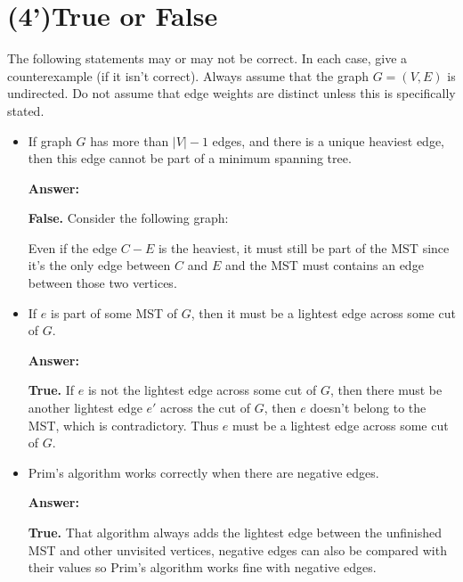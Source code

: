 \documentclass{article}
\begin{document}
\section{(4')True or False}
The following statements may or may not be correct. In each case, give a counterexample (if it isn’t correct). Always assume that the graph $G = (V, E)$ is undirected. Do not assume that edge weights are distinct unless this is specifically stated.
\begin{itemize}
	\item If graph $G$ has more than $|V|-1$ edges, and there is a unique heaviest edge, then this edge cannot be part of a minimum spanning tree.
	\par\textbf{Answer:}
	\par\textbf{False.} Consider the following graph:
	\par{}
    \par Even if the edge $C-E$ is the heaviest, it must still be part of the MST since it's the only edge between $C$ and $E$ and the MST must contains an edge between those two vertices.
	\vspace{0.3in}
	
	\item If $e$ is part of some MST of $G$, then it must be a lightest edge across some cut of $G$.
	\par\textbf{Answer:}
	\par\textbf{True.} If $e$ is not the lightest edge across some cut of $G$, then there must be another lightest edge $e'$ across the cut of $G$, then $e$ doesn't belong to the MST, which is contradictory. Thus $e$ must be a lightest edge across some cut of $G$.
	\vspace{0.3in}

	\item Prim’s algorithm works correctly when there are negative edges.
	\par\textbf{Answer:}
	\par\textbf{True.} That algorithm always adds the lightest edge between the unfinished MST and other unvisited vertices, negative edges can also be compared with their values so Prim's algorithm works fine with negative edges.
    \vspace{0.3in}
\end{itemize}
\newpage
\end{document}
